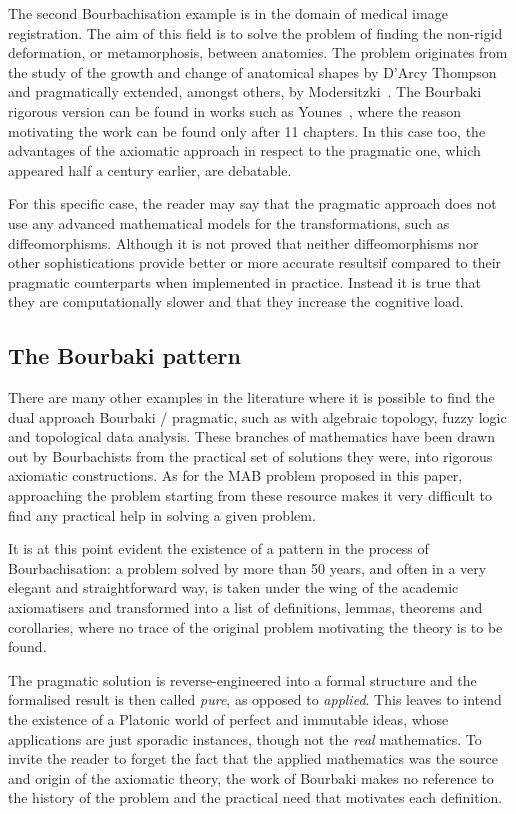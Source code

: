\documentclass[]{scrartcl}
\theoremstyle{definition}
\begin{document}
The second Bourbachisation example is in the domain of medical image registration. The aim of this field is to solve the problem of finding the non-rigid deformation, or metamorphosis, between anatomies. The problem originates from the study of the growth and change of anatomical shapes by D'Arcy Thompson~\cite{d1942growth} and pragmatically extended, amongst others, by Modersitzki~\cite{modersitzki2004numerical}. The Bourbaki rigorous version can be found in works such as Younes~\cite{younes2010shapes}, where the reason motivating the work can be found only after 11 chapters.
In this case too, the advantages of the axiomatic approach in respect to the pragmatic one, which appeared half a century earlier, are debatable.

For this specific case, the reader may say that the pragmatic approach \cite{modersitzki2004numerical} does not use any advanced mathematical models for the transformations, such as diffeomorphisms. Although it is not proved that neither diffeomorphisms nor other sophistications provide better or more accurate resultsif compared to their pragmatic counterparts when implemented in practice. Instead it is true that they are computationally slower and that they increase the cognitive load.


\subsection*{The Bourbaki pattern}

There are many other examples in the literature where it is possible to find the dual approach Bourbaki / pragmatic, such as with algebraic topology, fuzzy logic and topological data analysis. 
These branches of mathematics have been drawn out by Bourbachists from the practical set of solutions they were, into rigorous axiomatic constructions. As for the MAB problem proposed in this paper, approaching the problem starting from these resource makes it very difficult to find any practical help in solving a given problem.

It is at this point evident the existence of a pattern in the process of Bourbachisation: a problem solved by more than 50 years, and often in a very elegant and straightforward way, is taken under the wing of the academic axiomatisers and transformed into a list of definitions, lemmas, theorems and corollaries, where no trace of the original problem motivating the theory is to be found.

The pragmatic solution is reverse-engineered into a formal structure and the formalised result is then called \emph{pure}, as opposed to \emph{applied}. This leaves to intend the existence of a Platonic world of perfect and immutable ideas, whose applications are just sporadic instances, though not the \emph{real} mathematics. To invite the reader to forget the fact that the applied mathematics was the source and origin of the axiomatic theory, the work of Bourbaki makes no reference to the history of the problem and the practical need that motivates each definition.
\end{document}
